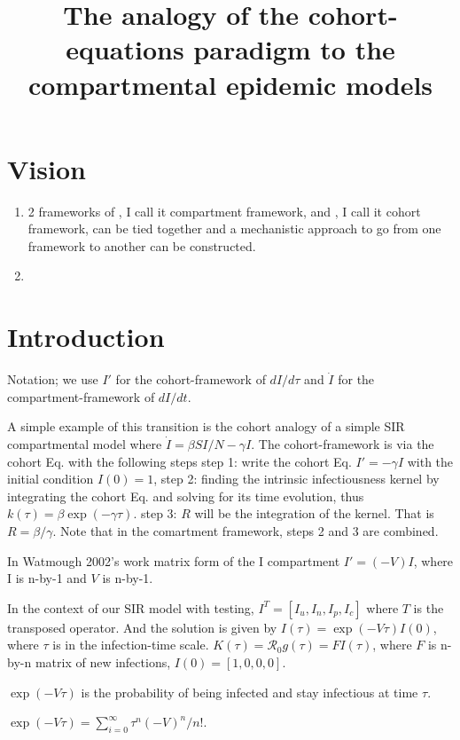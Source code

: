 \documentclass[12pt]{article}
\title{The analogy of the cohort-equations paradigm to the compartmental epidemic models}
\newcommand{\Rnot}{\ensuremath{\mathcal{R}_0}}
\theoremstyle{definition} %
\begin{document}
\maketitle
\linenumbers

\section{Vision}
\begin{enumerate}
\item 2 frameworks of \cite{van2002reproduction}, I call it compartment framework, and \cite{champredon2018equivalence}, I call it cohort framework, can be tied together and a mechanistic approach to go from one framework to another can be constructed.

\item 
\end{enumerate}

\section{Introduction}
Notation; we use $I'$ for the cohort-framework of $dI/d\tau$ and $\dot I$ for the compartment-framework of $dI/dt$. 

A simple example of this transition is the cohort analogy of a simple SIR compartmental model where $\dot I=\beta S I/N-\gamma I$. The cohort-framework is via the cohort Eq. with the following steps
step 1: write the cohort Eq. $I'=-\gamma I$ with the initial condition $I(0)=1$, 
step 2: finding the intrinsic infectiousness kernel by integrating the cohort Eq. and solving for its time evolution, thus
$k(\tau)=\beta \exp(-\gamma \tau)$.
step 3: $R$ will be the integration of the kernel. That is $R=\beta/\gamma$. 
Note that in the comartment framework, steps 2 and 3 are combined.




In Watmough 2002's work matrix form of the I compartment $I'=(-V)I$, where I is n-by-1 and $V$ is n-by-1.

In the context of our SIR model with testing, $I^T=[I_u,I_n,I_p,I_c]$ where $T$ is the transposed operator.
And the solution is given by $I(\tau) = \exp(-V\tau) I(0)$, where $\tau$ is in the infection-time scale.
$K(\tau)=\Rnot g(\tau)= F I(\tau)$,
where $F$ is n-by-n matrix of new infections, $I(0)=[1,0,0,0]$.

$\exp(-V\tau)$ is the probability of being infected and stay infectious at time $\tau$.

$\exp(-V\tau)=\sum_{i=0}^\infty \tau^n (-V)^n/n!$.






\end{document}
